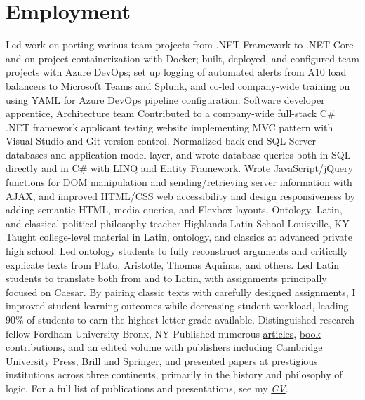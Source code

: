 \section{Employment}
{Led work on porting various team projects from .NET Framework to .NET Core and on project containerization with Docker; built, deployed, and configured team projects with Azure DevOps; set up logging of automated alerts from A10 load balancers to Microsoft Teams and Splunk, and co-led company-wide training on using YAML for Azure DevOps pipeline configuration.
}
{Software developer apprentice, Architecture team}
{}
{}
{}
{Contributed to a company-wide full-stack C\# .NET framework applicant testing website implementing MVC pattern with Visual Studio and Git version control. Normalized back-end SQL Server databases and application model layer, and wrote database queries both in SQL directly and in C\# with LINQ and Entity Framework. Wrote JavaScript/jQuery functions for DOM manipulation and sending/retrieving server information with AJAX, and improved HTML/CSS web accessibility and design responsiveness by adding semantic HTML, media queries, and Flexbox layouts. 
	}
{Ontology, Latin, and classical political philosophy teacher}
{Highlands Latin School}
{Louisville, KY}
{}
{Taught college-level material in Latin, ontology, and classics at advanced private high school. 
	Led ontology students to fully reconstruct arguments 
	and critically explicate texts from Plato, Aristotle, Thomas Aquinas, and others. 
	Led Latin students to translate both from and to Latin, 
	with assignments principally focused on Caesar. 
	By pairing classic texts with carefully designed assignments, 
	I improved student learning outcomes 
	while decreasing student workload, 
	leading 90\% of students to earn the highest letter grade available.}
{Distinguished research fellow}
{Fordham University}
{Bronx, NY}
{}
{Published numerous \href{https://fordham.academia.edu/jacobarchambault}{articles}, \href{https://www.collegepublications.co.uk/dialogues/?00005}{book} \href{https://www.cambridgescholars.com/hylomorphism-and-mereology}{contributions}, and an \href{https://brill.com/view/journals/viv/56/3-4/viv.56.issue-3-4.xml?language=en}{edited volume }
	with publishers including Cambridge University Press, Brill and Springer, 
	and presented papers at prestigious institutions across three continents, 
	primarily in the history and philosophy of logic. 
	For a full list of publications and presentations, see my 
	\href{https://jacobarchambault.com/curriculum-vitae}{\emph{CV}}.}
